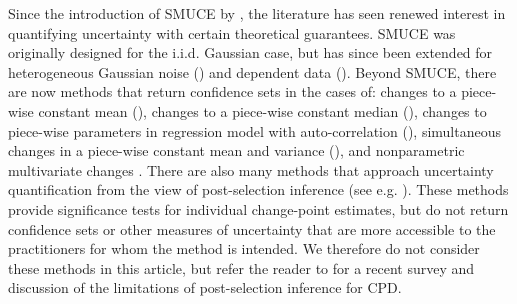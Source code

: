 Since the introduction of SMUCE by \cite{Frick14}, the literature has seen renewed interest in quantifying uncertainty with certain theoretical guarantees. SMUCE was originally designed for the i.i.d. Gaussian case, but has since been extended for heterogeneous Gaussian noise (\citealp{Pein17}) and dependent data (\citealp{Dette20}). Beyond SMUCE, there are now methods that return confidence sets in the cases of: changes to a piece-wise constant mean (\citealp{Fang20}), changes to a piece-wise constant median (\citealp{Fryzlewicz24median}), changes to piece-wise parameters in regression model with auto-correlation (\citealp{fang2021detectionestimationlocalsignals, Fryzlewicz24}), simultaneous changes in a piece-wise constant mean and variance (\citealp{Eichinger18}), and nonparametric multivariate changes \cite{madrid2023change}. There are also many methods that approach uncertainty quantification from the view of post-selection inference (see e.g. ). These methods provide significance tests for individual change-point estimates, but do not return confidence sets or other measures of uncertainty that are more accessible to the practitioners for whom the method is intended. We therefore do not consider these methods in this article, but refer the reader to \cite{Fryzlewicz24} for a recent survey and discussion of the limitations of post-selection inference for CPD.  